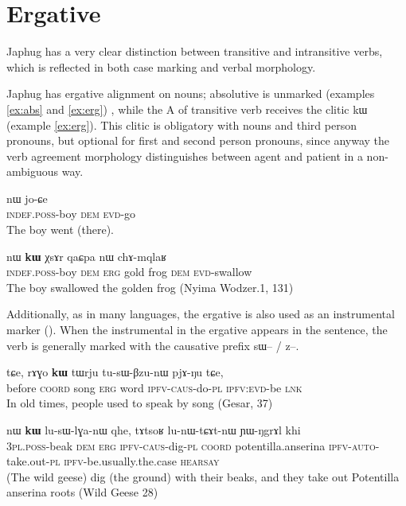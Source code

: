 \documentclass[oldfontcommands,oneside,a4paper,11pt]{article}
\newcommand{\ipa}[1]{{\phon #1}} %
\begin{document}
\section{Ergative} \label{sec:erg}
Japhug has a very clear   distinction between transitive and intransitive verbs, which is reflected in both case marking and verbal morphology.

Japhug has ergative alignment on nouns; absolutive is unmarked (examples \ref{ex:abs} and \ref{ex:erg}) , while the A of transitive verb receives the clitic \ipa{kɯ} (example \ref{ex:erg}). This clitic is obligatory with nouns and third person pronouns, but optional for first and second person pronouns, since anyway the verb agreement morphology distinguishes between agent and patient in a non-ambiguous way.

\begin{exe}
\ex \label{ex:abs}
\gll \ipa{tɤ-tɕɯ}  	\ipa{nɯ}  	 	\ipa{jo-ɕe}   \\
\textsc{indef.poss}-boy \textsc{dem}   \textsc{evd}-go \\
\glt The boy went (there).
\end{exe}

\begin{exe}
\ex \label{ex:erg}
\gll \ipa{tɤ-tɕɯ}  	\ipa{nɯ}  	\ipa{\textbf{kɯ}} 	\ipa{χsɤr}  	\ipa{qaɕpa}  	\ipa{nɯ}  	\ipa{chɤ-mqlaʁ}   \\
\textsc{indef.poss}-boy \textsc{dem} \textsc{erg} gold frog \textsc{dem} \textsc{evd}-swallow \\
\glt The boy swallowed the golden frog (Nyima Wodzer.1, 131)
\end{exe}


Additionally, as in many languages, the ergative is also used as an instrumental marker (\citealt[32]{agent02palancar}). When the instrumental in the ergative appears in the sentence, the verb is generally marked with the causative prefix \ipa{sɯ}-- / \ipa{z}--. 

\begin{exe}
\ex \label{ex:instr}
\gll \ipa{kɯɕɯŋgɯ}   	\ipa{tɕe,}   	\ipa{rɤɣo}   	\ipa{\textbf{kɯ}}   	\ipa{tɯrju}   	\ipa{tu-sɯ-βzu-nɯ}   	\ipa{pjɤ-ŋu}   	\ipa{tɕe,}     \\
before \textsc{coord} song \textsc{erg} word \textsc{ipfv}-\textsc{caus}-do-\textsc{pl} \textsc{ipfv:evd}-be \textsc{lnk}\\
\glt  In old times, people used to speak by song (Gesar, 37)
\end{exe}
 \begin{exe}
\ex \label{ex:instr2}
\gll \ipa{nɯ-mtsioʁ}   	\ipa{nɯ}   	\ipa{\textbf{kɯ}}   	\ipa{lu-sɯ-lɣa-nɯ}   	\ipa{qhe,}   	\ipa{tɤtsoʁ}   	\ipa{lu-nɯ-tɕɤt-nɯ}   	\ipa{ɲɯ-ŋgrɤl}   	\ipa{khi}        \\
\textsc{3pl.poss}-beak \textsc{dem} \textsc{erg} \textsc{ipfv-caus}-dig-\textsc{pl} \textsc{coord} potentilla.anserina \textsc{ipfv-auto}-take.out-\textsc{pl} \textsc{ipfv}-be.usually.the.case \textsc{hearsay} \\
\glt  (The wild geese) dig (the ground) with their beaks, and they take out Potentilla anserina roots (Wild Geese 28)
\end{exe}
\end{document}
